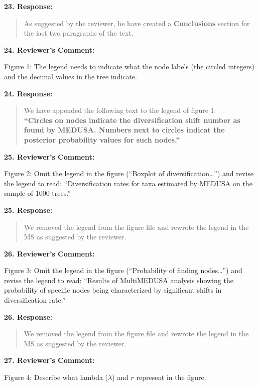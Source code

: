 \documentclass[]{article}
\begin{document}
\textbf{23. Response:}

\begin{quote}
\color{blue}
\color{blue}
\color{blue}
As suggested by the reviewer, he have created a \textbf{Conclusions}
section for the last two paragraphs of the text.
\end{quote}

\textbf{24. Reviewer's Comment:}

Figure 1: The legend needs to indicate what the node labels (the circled
integers) and the decimal values in the tree indicate.

\textbf{24. Response:}

\begin{quote}
\color{blue}
\color{blue}
\color{blue}
We have appended the following text to the legend of figure
1:\\\textbf{``Circles on nodes indicate the diversification shift number
as found by MEDUSA. Numbers next to circles indicat the posterior
probability values for such nodes.''}
\end{quote}

\textbf{25. Reviewer's Comment:}

Figure 2: Omit the legend in the figure (``Boxplot of
diversification\ldots{}'') and revise the legend to read:
``Diversification rates for taxa estimated by MEDUSA on the sample of
1000 trees.''

\textbf{25. Response:}

\begin{quote}
\color{blue}
\color{blue}
\color{blue}
We removed the legend from the figure file and rewrote the legend in the
MS as suggested by the reviewer.
\end{quote}

\textbf{26. Reviewer's Comment:}

Figure 3: Omit the legend in the figure (``Probability of finding
nodes\ldots{}'') and revise the legend to read: ``Results of MultiMEDUSA
analysis showing the probability of specific nodes being characterized
by significant shifts in diversification rate.''

\textbf{26. Response:}

\begin{quote}
\color{blue}
We removed the legend from the figure file and rewrote the legend in the
MS as suggested by the reviewer.
\end{quote}

\textbf{27. Reviewer's Comment:}

Figure 4: Describe what lambda (\(\lambda\)) and \(r\) represent in the
figure.
\end{document}
